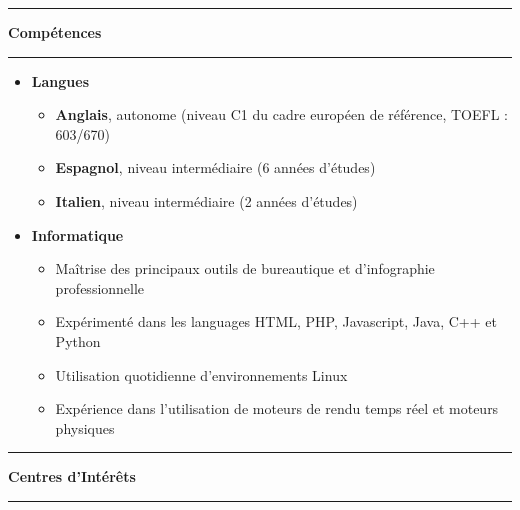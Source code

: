 \documentclass[a4paper,11pt]{article} %
\newcommand{\trad}[2]{#2}
\newcommand{\titre}[1]{%
	\begin{center}
	\rule{\textwidth}{1pt}
	\par
	\vspace{0.1cm}
        \textbf{\large #1}
	\par\rule{\textwidth}{1pt}
	\end{center}
	}
\begin{document}
\titre{\trad{Competences}{Compétences}}

\begin{itemize}
\item \textbf{\trad{Languages}{Langues}}
	\begin{itemize} 
	\trad{\item \textbf{French}, mother tongue}{}
	\item \trad{\textbf{English}, fluent (C1 in the Common European Framework, TOEFL : 603/670)}{\textbf{Anglais}, autonome (niveau C1 du cadre européen de référence, TOEFL : 603/670)}
	\item \trad{\textbf{Spanish}, intermediate (6 years of study)}{\textbf{Espagnol}, niveau intermédiaire (6 années d'études)}
	\item \trad{\textbf{Italian}, intermediate (2 years of study)}{\textbf{Italien}, niveau intermédiaire (2 années d'études)}
	\end{itemize}
\item \textbf{\trad{Computer}{Informatique}}
	\begin{itemize}
	\item \trad{Knowledge of the main office and professional digital art software}             {Maîtrise des principaux outils de bureautique et d'infographie professionnelle}
	\item \trad{Knowledge of programming languages HTML, PHP, Javascript, Java, C++ and Python}            {Expérimenté dans les languages HTML, PHP, Javascript, Java, C++ et Python}
	\item \trad{Everyday use of Linux}                                                          {Utilisation quotidienne d'environnements Linux}
    \item \trad{TODO}                                                                           {Expérience dans l'utilisation de moteurs de rendu temps réel et moteurs physiques}
	\end{itemize}
\end{itemize}

\titre{\trad{Interests}{Centres d'Intérêts}}
\end{document}
